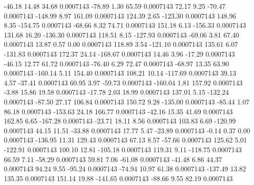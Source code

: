       -46.18       14.48       34.68     0.0007143
      -78.89        1.30       65.59     0.0007143
       72.17        9.25      -70.47     0.0007143
     -148.99        8.97      161.09     0.0007143
      124.39        2.65     -123.30     0.0007143
      148.96        8.35     -154.75     0.0007143
      -68.66        8.32       74.71     0.0007143
      151.18        6.13     -156.33     0.0007143
      131.68       16.20     -136.30     0.0007143
      118.51        8.15     -127.93     0.0007143
      -69.06        3.81       67.40     0.0007143
       13.87        0.57        0.00     0.0007143
      118.89        3.54     -121.10     0.0007143
      135.61        6.07     -131.83     0.0007143
      172.37       24.14     -168.67     0.0007143
       14.46        3.96      -17.29     0.0007143
      -46.15       12.77       61.72     0.0007143
      -76.40        6.29       72.47     0.0007143
      -68.97       13.35       63.90     0.0007143
     -160.14        5.11      154.40     0.0007143
      108.21       10.14     -117.69     0.0007143
       39.13        4.57      -37.41     0.0007143
       60.95        3.97      -59.73     0.0007143
     -160.04        1.81      157.92     0.0007143
       -3.88       15.86       19.58     0.0007143
      -17.78        2.03       18.99     0.0007143
      137.01        5.15     -132.24     0.0007143
      -87.50       27.17      106.84     0.0007143
      150.72        9.28     -135.00     0.0007143
      -85.44        1.07       86.18     0.0007143
     -153.63       24.18      166.77     0.0007143
      -42.16       15.35       41.69     0.0007143
      162.85        6.65     -167.28     0.0007143
      -23.71       18.11        8.56     0.0007143
      103.83        6.69     -120.99     0.0007143
       44.15       11.51      -33.88     0.0007143
       17.77        5.47      -23.89     0.0007143
       -0.14        0.37        0.00     0.0007143
     -136.95       11.31      129.43     0.0007143
       67.13        8.57      -57.66     0.0007143
      125.62        5.01     -122.91     0.0007143
      100.10       12.81     -105.18     0.0007143
      119.31        9.11     -118.75     0.0007143
       66.59        7.11      -58.29     0.0007143
       59.81        7.06      -61.08     0.0007143
      -41.48        6.86       44.37     0.0007143
       94.24        9.55      -95.24     0.0007143
      -74.94       10.97       61.38     0.0007143
     -137.49       13.82      135.35     0.0007143
      151.14       19.88     -141.65     0.0007143
      -88.66        9.55       82.19     0.0007143
